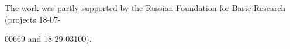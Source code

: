 





\Ack

\noindent

The work was partly supported by the Russian Foundation for Basic Research (projects 18-07-

00669 and 18-29-03100).





\renewcommand{\bibname}{\protect\rmfamily References}




